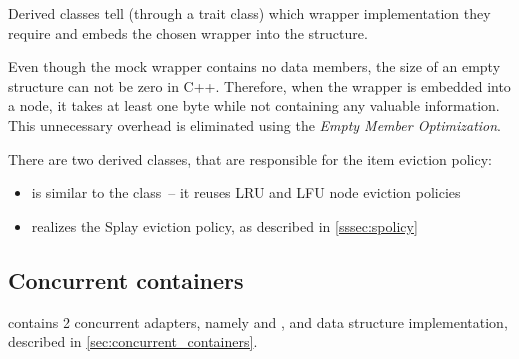 Derived classes tell  (through a trait class) which wrapper implementation they require and  embeds the chosen wrapper into the  structure.

Even though the mock wrapper contains no data members, the size of an empty structure can not be zero in C++\cite{sizeof_empty}. Therefore, when the wrapper is embedded into a node, it takes at least one byte while not containing any valuable information. This unnecessary overhead is eliminated using the \emph{Empty Member Optimization}\cite{ebo}.


There are two derived classes, that are responsible for the item eviction policy:
 \begin{itemize}[leftmargin=2cm]
 \item [\classname{SplayTreeFairLu}] is similar to the  class~-- it reuses LRU and LFU node eviction policies
 \item [\classname{SplayTreeBottomNode}] realizes the Splay eviction policy, as described in \cref{sssec:spolicy}
\end{itemize}

\subsection{Concurrent containers}
  \numdbname contains 2 concurrent adapters, namely  and , and \cndcname data structure implementation, described in \cref{sec:concurrent_containers}.

